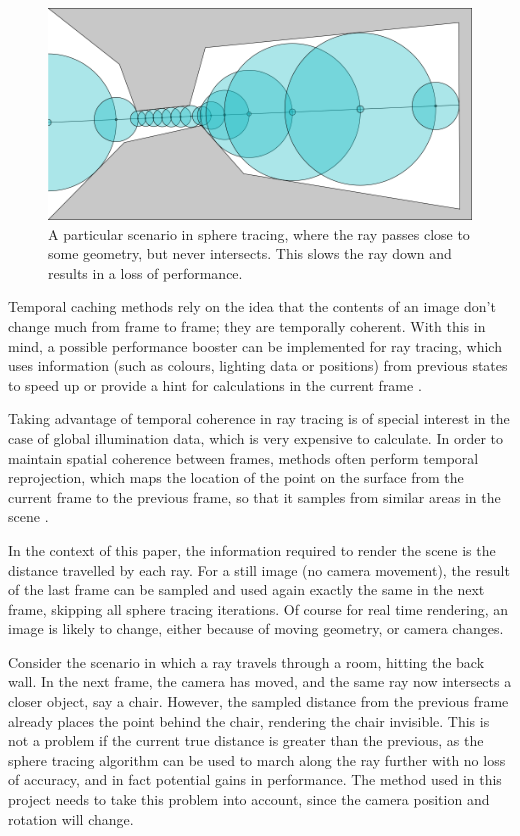 \begin{figure} [ht]
	\centering
	\includegraphics[width=0.75\linewidth, frame]{Images/Sphere-Tracing-Bottleneck.png}
	\caption{A particular scenario in sphere tracing, where the ray passes close to some geometry, but never intersects. This slows the ray down and results in a loss of performance.}
	\label{figure:sphere-tracing-bottleneck}
\end{figure}

Temporal caching methods rely on the idea that the contents of an image don't change much from frame to frame; they are temporally coherent. With this in mind, a possible performance booster can be implemented for ray tracing, which uses information (such as colours, lighting data or positions) from previous states to speed up or provide a hint for calculations in the current frame \cite{cosenza2008estimating}.\newline

Taking advantage of temporal coherence in ray tracing is of special interest in the case of global illumination data, which is very expensive to calculate. In order to maintain spatial coherence between frames, methods often perform temporal reprojection, which maps the location of the point on the surface from the current frame to the previous frame, so that it samples from similar areas in the scene \cite{scherzer2012temporal}.\newline

In the context of this paper, the information required to render the scene is the distance travelled by each ray. For a still image (no camera movement), the result of the last frame can be sampled and used again exactly the same in the next frame, skipping all sphere tracing iterations. Of course for real time rendering, an image is likely to change, either because of moving geometry, or camera changes.\newline

Consider the scenario in which a ray travels through a room, hitting the back wall. In the next frame, the camera has moved, and the same ray now intersects a closer object, say a chair. However, the sampled distance from the previous frame already places the point behind the chair, rendering the chair invisible. This is not a problem if the current true distance is greater than the previous, as the sphere tracing algorithm can be used to march along the ray further with no loss of accuracy, and in fact potential gains in performance. The method used in this project needs to take this problem into account, since the camera position and rotation will change.\newline

